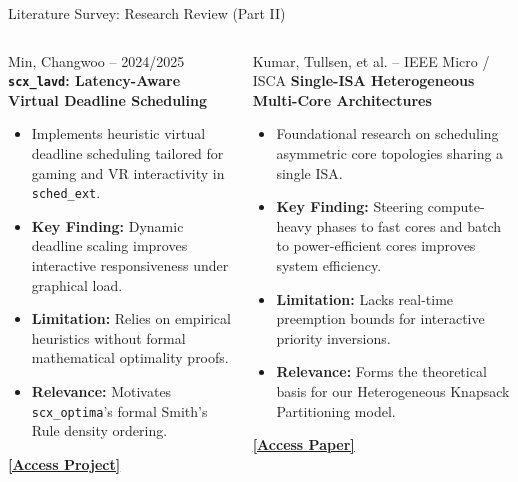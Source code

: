 \documentclass{beamer}
\begin{document}
\begin{frame}{Literature Survey: Research Review (Part II)}
  \footnotesize
  \begin{columns}[T]
      \begin{block}{\color{white}Min, Changwoo -- 2024/2025}
        \textbf{\texttt{scx\_lavd}: Latency-Aware Virtual Deadline Scheduling}
        \begin{itemize}\scriptsize\itemsep2pt
          \item Implements heuristic virtual deadline scheduling tailored for gaming and VR interactivity in \texttt{sched\_ext}.
          \item \textbf{Key Finding:} Dynamic deadline scaling improves interactive responsiveness under graphical load.
          \item \textbf{Limitation:} Relies on empirical heuristics without formal mathematical optimality proofs.
          \item \textbf{Relevance:} Motivates \texttt{scx\_optima}'s formal Smith's Rule density ordering.
        \end{itemize}
        \href{https://github.com/sched-ext/scx}{\textcolor{primary}{\textbf{[Access Project]}}}
      \end{block}

      \begin{block}{\color{white}Kumar, Tullsen, et al. -- IEEE Micro / ISCA}
        \textbf{Single-ISA Heterogeneous Multi-Core Architectures}
        \begin{itemize}\scriptsize\itemsep2pt
          \item Foundational research on scheduling asymmetric core topologies sharing a single ISA.
          \item \textbf{Key Finding:} Steering compute-heavy phases to fast cores and batch to power-efficient cores improves system efficiency.
          \item \textbf{Limitation:} Lacks real-time preemption bounds for interactive priority inversions.
          \item \textbf{Relevance:} Forms the theoretical basis for our Heterogeneous Knapsack Partitioning model.
        \end{itemize}
        \href{https://doi.org/10.1109/MM.2003.1246182}{\textcolor{primary}{\textbf{[Access Paper]}}}
      \end{block}
  \end{columns}
\end{frame}
\end{document}
